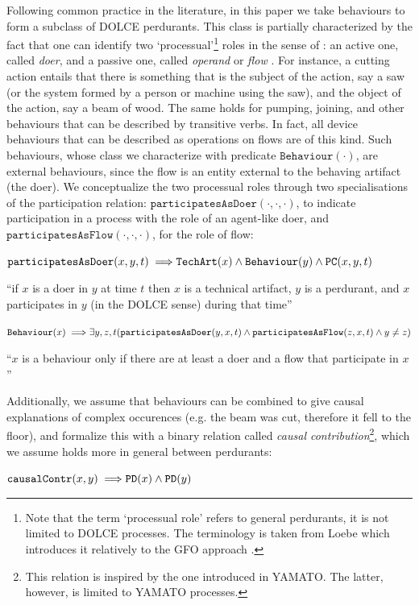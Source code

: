 \documentclass[sw]{iosart2x}
\newcommand{\bflist}{\begin{list}{}{\setlength{\topsep}{2mm}\setlength{\partopsep}{0mm}\setlength{\parsep}{0mm}\setlength{\leftmargin}{9mm}\setlength{\labelwidth}{8mm}}}
\newcommand{\eflist}{\end{list}}
\newcommand{\AxLabel}{\textrm{a}}
\newcounter{cntax}
\newcommand{\myax}[1]{\refstepcounter{cntax}\begin{small}{\bf \AxLabel\thecntax\label{ax:#1}}\end{small}}
\newcommand{\mytext}[1]{``#1''}
\newcommand{\generalStyle}[1]{\texttt{#1}}
\newcommand{\biRel}[3]{\generalStyle{#1}(#2,#3)}
\newcommand{\uniRel}[2]{\generalStyle{#1}(#2)}
\newcommand{\triRel}[4]{\generalStyle{#1}(#2,#3,#4)}
\newcommand{\myfi}{\hspace{0.9mm} \Longrightarrow}
\newcommand{\DOLCE}{\textsc{DOLCE}\xspace} %
\newcommand{\YAMATO}{\textsc{YAMATO}\xspace}
\newcommand{\DOLCEPerdurant}[1]{\uniRel{{PD}}{#1}}
\newcommand{\DOLCEPC}[3]{\triRel{{PC}}{#1}{#2}{#3}}
\newcommand{\TechArt}[1]{\uniRel{TechArt}{#1}}
\newcommand{\BehaviourConcrete}[1]{\uniRel{Behaviour}{#1}}
\newcommand{\causallyContr}[2]{\biRel{causalContr}{#1}{#2}}
\newcommand{\participateAsDoer}[3]{\triRel{participatesAsDoer}{#1}{#2}{#3}}
\newcommand{\participateAsFlow}[3]{\triRel{participatesAsFlow}{#1}{#2}{#3}}
\newcommand{\firstTimeKeyWord}[1]{\textit{#1}}
\newcommand{\quotes}[1]{`#1'}
\begin{document}
Following common practice in the literature, in this paper we take behaviours to form a subclass of \DOLCE perdurants. This class is partially characterized by the fact that one can identify two `processual'\footnote{Note that the term \quotes{processual role} refers to general perdurants, it is not limited to \DOLCE processes. The terminology is taken from Loebe which introduces it relatively to the GFO approach \cite{loebeAbstractVsSocial2007}.} roles in the sense of \cite{loebeAbstractVsSocial2007}: an active one, called \firstTimeKeyWord{doer}, and a passive one, called \firstTimeKeyWord{operand} or \firstTimeKeyWord{flow} \cite{pahl_engineering_2007}. 
For instance, a cutting action entails that there is something that is the subject of the action, say a saw (or the system formed by a person or machine using the saw), and the object of the action, say a beam of wood.
The same holds for pumping, joining, and other behaviours that can be described by transitive verbs. 
In fact, all device behaviours that can be described as operations on flows are of this kind. 
Such behaviours, whose class we characterize with predicate $\BehaviourConcrete{\cdot}$, are external behaviours, since the flow is an entity external to the behaving artifact (the doer).
We conceptualize the two processual roles through two specialisations of the participation relation: $\participateAsDoer{\cdot}{\cdot}{\cdot}$, to indicate participation in a process with the role of an agent-like doer, and $\participateAsFlow{\cdot}{\cdot}{\cdot}$, for the role of flow: 
\bflist
  \item[\myax{participateAsDoerRage}]  $ \participateAsDoer{x}{y}{t} \myfi \TechArt{x} \land \BehaviourConcrete{y} \land \DOLCEPC{x}{y}{t}$
\item \mytext{if $x$ is a doer in $y$ at time $t$ then $x$ is a technical artifact, $y$ is a perdurant, and $x$ participates in $y$ (in the \DOLCE sense) during that time}
  \item[\myax{processualRoles}] $ \BehaviourConcrete{x} \myfi \exists y,z,t(\participateAsDoer{y}{x}{t} \land \participateAsFlow{z}{x}{t} \land y \neq z) $ 
\item \mytext{$x$ is a behaviour only if there are at least a doer and a flow that participate in $x$}
\eflist

Additionally, we assume that behaviours can be combined to give causal explanations of complex occurences (e.g. the beam was cut, therefore it fell to the floor), and formalize this with a binary relation called \firstTimeKeyWord{causal contribution}\footnote{This relation is inspired by the one introduced in \YAMATO \cite{mizoguchiYAMATOAnotherMore}. The latter, however, is limited to \YAMATO processes.}, which we assume holds more in general between perdurants:
\bflist
  \item[\myax{contribRange}] $ \causallyContr{x}{y} \myfi \DOLCEPerdurant{x} \land \DOLCEPerdurant{y} $
\eflist
\end{document}
